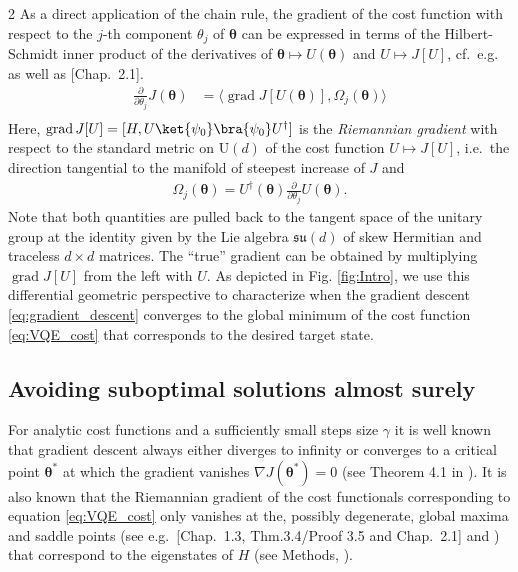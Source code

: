 \documentclass{article}
\renewcommand{\vec}[1]{\ensuremath{\boldsymbol{#1}}}
\begin{document}
\begin{multicols}{2}
As a direct application of the chain rule, the gradient of the cost function with respect to the $j$-th component $\theta_{j}$ of $\vec{\theta}$ can be expressed in terms of the Hilbert-Schmidt inner product of the derivatives of %
$\vec{\theta} \mapsto U(\vec{\theta})$ and $U \mapsto J[U]$, cf.~e.g.\cite{Bro88+91,smith_optimization_1994,SGDH08,PhysRevA.86.013405,10.1063/1.2198837}
as well as \cite{HM94}[Chap.~2.1].
\begin{equation}
    \begin{split}
    \label{eq:gradient_decomposition}
    \frac{\partial}{\partial \theta_j}J(\vec{\theta}) &= \langle \operatorname{grad}J[U(\vec{\theta})], \Omega_j(\vec{\theta}) \rangle\\
    \end{split}
\end{equation}
Here, \(\operatorname{grad}J[U] = [H, U\ket{\psi_0}\bra{\psi_0}U^\dagger]\) is the \textit{Riemannian gradient} with respect to the standard metric on \(\mathrm{U}(d)\) of the cost function $U \mapsto J[U]$, 
i.e.~the direction tangential to the manifold of steepest increase of \(J\) and
\begin{align}
\label{eq:LieAlgElements}
\Omega_j(\vec{\theta}) = U^\dagger(\vec{\theta}) \frac{\partial}{\partial \theta_j} U(\vec{\theta}).
\end{align}
Note that both quantities are pulled back to the tangent space of the unitary group at the identity given by the Lie algebra $\mathfrak{su}(d)$ of skew Hermitian and traceless $d\times d$ matrices. The ``true'' gradient can be obtained by multiplying 
$\operatorname{grad}J[U]$ from the left with $U$. As depicted in Fig. \ref{fig:Intro}, we use this differential geometric perspective to characterize when the gradient descent \eqref{eq:gradient_descent} converges to the global minimum of the cost function \eqref{eq:VQE_cost} that corresponds to the desired target state. 

\subsection{Avoiding suboptimal solutions almost surely}
For analytic cost functions and a sufficiently small steps size $\gamma$ it is well known that gradient descent always either diverges to infinity or converges to a critical point \(\vec{\theta}^*\) at which the gradient vanishes \(\nabla J(\vec{\theta}^*) = 0\) (see Theorem 4.1 in \cite{absil_convergence_2005}). It is also known that the Riemannian gradient of the cost functionals corresponding to equation \eqref{eq:VQE_cost} only vanishes at the, possibly degenerate, global maxima and saddle points (see e.g.~\cite{HM94}[Chap.~1.3, Thm.3.4/Proof 3.5 and Chap.~2.1] and \cite{Duistermaat83})
that correspond to the eigenstates of $H$ (see Methods, ). 


\end{multicols}
\end{document}
